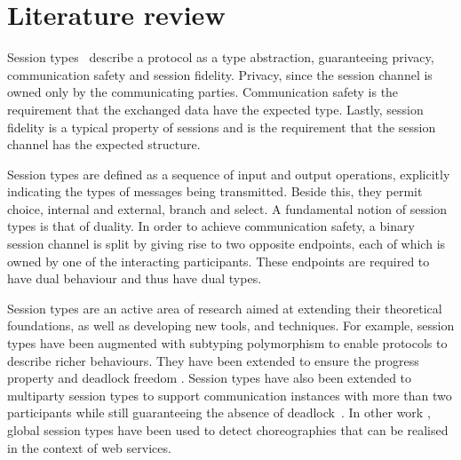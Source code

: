 \section{Literature review}
\label{litreview}

Session types~\cite{HondaK:typdi, HondaK:intblt1, HondaK:lanptd} describe a protocol as a type abstraction, guaranteeing privacy, communication safety and session fidelity. Privacy, since the session channel is owned only by the communicating parties. Communication safety is the requirement that the exchanged data have the expected type. Lastly, session fidelity is a typical property of sessions and is the requirement that the session channel has the expected structure.

Session types are defined as a sequence of input and output operations, explicitly indicating the types of messages being transmitted. Beside this, they permit choice, internal and external, branch and select. A fundamental notion of session types is that of duality. In order to achieve communication safety, a binary session channel is split by giving rise to two opposite endpoints, each of which is owned by one of the interacting participants. These endpoints are required to have dual behaviour and thus have dual types.

Session types are an active area of research aimed at extending their theoretical foundations, as well as developing new tools, and techniques. For example, session types have been augmented with subtyping polymorphism to enable protocols to describe richer behaviours\cite{GaySJ:substp}.
They have been extended to ensure the progress property and deadlock freedom \cite{dyl08}. Session types have also been extended to multiparty session types to support communication instances with more than two participants while still guaranteeing the absence of deadlock~\cite{HondaK:mulast}. In other work \cite{ch07}, global session types have been used to detect choreographies that can be realised in the context of web services.

